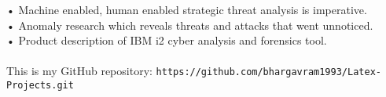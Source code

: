 \documentclass{article}
\begin{document}
•	Machine enabled, human enabled strategic threat analysis is imperative.\\
•	Anomaly research which reveals threats and attacks that went unnoticed.\\
•	Product description of IBM i2 cyber analysis and forensics tool.\\
\\
This is my GitHub repository: {\tt https://github.com/bhargavram1993/Latex-Projects.git }
\end{document}
